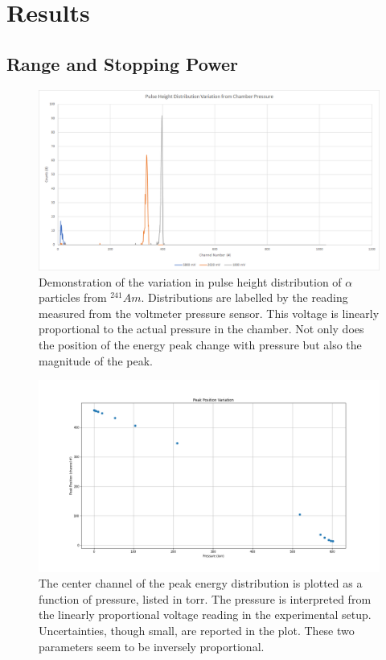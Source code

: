 \section{Results}

\subsection{Range and Stopping Power}

\begin{figure}
\centering
\includegraphics[width=\textwidth]{variation.png}
\caption{Demonstration of the variation in pulse height distribution of $\alpha$ particles from ${}^{241}Am$. Distributions are labelled by the reading measured from the voltmeter pressure sensor. This voltage is linearly proportional to the actual pressure in the chamber. Not only does the position of the energy peak change with pressure but also the magnitude of the peak.}
\label{fig:variation}
\end{figure}

\begin{figure}
\centering
\includegraphics[width=\textwidth]{peak_position.png}
\caption{The center channel of the peak energy distribution is plotted as a function of pressure, listed in torr. The pressure is interpreted from the linearly proportional voltage reading in the experimental setup. Uncertainties, though small, are reported in the plot. These two parameters seem to be inversely proportional.}
\label{fig:peak-position}
\end{figure}

